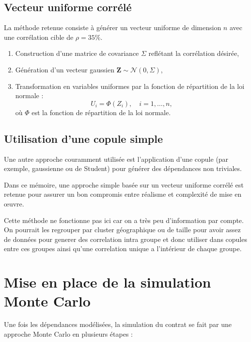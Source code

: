 \documentclass[11pt,a4paper,openright,twoside]{report}
\begin{document}
\subsection{Vecteur uniforme corrélé}
La méthode retenue consiste à générer un vecteur uniforme de dimension $n$ avec une corrélation cible de $\rho = 35\%$.  
\begin{enumerate}
    \item Construction d’une matrice de covariance $\Sigma$ reflétant la corrélation désirée,
    \item Génération d’un vecteur gaussien $\mathbf{Z} \sim \mathcal{N}(0, \Sigma)$,
    \item Transformation en variables uniformes par la fonction de répartition de la loi normale :
    \begin{equation}
        U_i = \Phi(Z_i), \quad i = 1, \dots, n,
    \end{equation}
    où $\Phi$ est la fonction de répartition de la loi normale.
\end{enumerate}

\subsection{Utilisation d’une copule simple}
Une autre approche couramment utilisée est l’application d’une copule (par exemple, gaussienne ou de Student) pour générer des dépendances non triviales.  

Dans ce mémoire, une approche simple basée sur un vecteur uniforme corrélé est retenue pour assurer un bon compromis entre réalisme et complexité de mise en œuvre.  

Cette méthode ne fonctionne pas ici car on a très peu d'information par compte. On pourrait les regrouper par cluster géographique ou de taille pour avoir assez de données pour generer des correlation intra groupe et donc utiliser dans copules entre ces groupes ainsi qu'une correlation unique a l'intérieur de chaque groupe.


\section{Mise en place de la simulation Monte Carlo}
Une fois les dépendances modélisées, la simulation du contrat se fait par une approche Monte Carlo en plusieurs étapes :  
\end{document}
